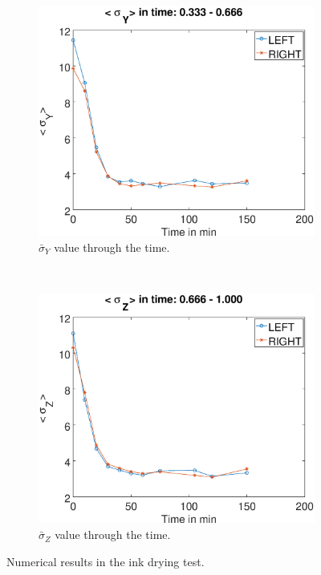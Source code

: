 \documentclass[review]{elsarticle}
\begin{document}
\begin{figure}[h!]
\begin{subfigure}[b]{0.475\textwidth}
        \label{fig:stdxink}
    \end{subfigure}
    ~\\ 
    \begin{subfigure}[b]{0.475\textwidth}
        \includegraphics[width=\textwidth]{std-bandy.eps}
	\caption{$\bar{\sigma}_Y$ value through  the time.}
        \label{fig:stdyink}
    \end{subfigure}
  ~
    \begin{subfigure}[b]{0.475\textwidth}
        \includegraphics[width=\textwidth]{std-bandz.eps}
	\caption{$\bar{\sigma}_Z$ value through  the time.}
        \label{fig:stdzink}
    \end{subfigure}
    
\caption{Numerical results in the ink drying test.}\label{fig:numerical}
\end{figure}
\end{document}
